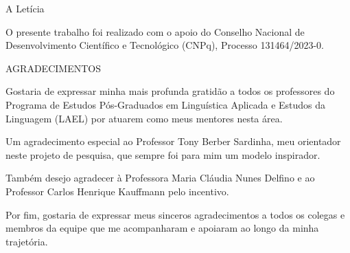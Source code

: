 \begin{titlepage}
    \begin{center}
        \vspace*{11cm}
        {A Letícia}
        \vfill
    \end{center}
\end{titlepage}

\begin{titlepage}
    \vspace*{10cm}
    \begin{adjustwidth}{0.5\textwidth}{0cm}
        O presente trabalho foi realizado com o apoio do Conselho Nacional de Desenvolvimento Científico e Tecnológico (CNPq), Processo 131464/2023-0.
    \end{adjustwidth}
\end{titlepage}

\begin{titlepage}
    \begin{center}
        {\large \MakeUppercase{Agradecimentos}}
    \end{center}
    \vspace{1cm}
    Gostaria de expressar minha mais profunda gratidão a todos os professores do Programa de Estudos Pós-Graduados em Linguística Aplicada e Estudos da Linguagem (LAEL) por atuarem como meus mentores nesta área.

    Um agradecimento especial ao Professor Tony Berber Sardinha, meu orientador neste projeto de pesquisa, que sempre foi para mim um modelo inspirador.

    Também desejo agradecer à Professora Maria Cláudia Nunes Delfino e ao Professor Carlos Henrique Kauffmann pelo incentivo.

    Por fim, gostaria de expressar meus sinceros agradecimentos a todos os colegas e membros da equipe que me acompanharam e apoiaram ao longo da minha trajetória.
\end{titlepage}

